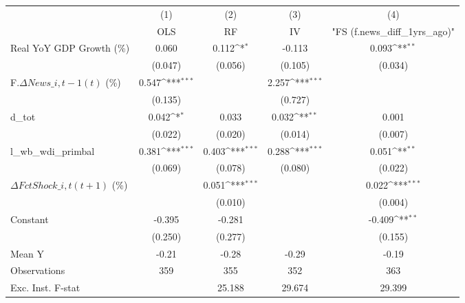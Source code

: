 {
\def\sym#1{\ifmmode^{#1}\else\(^{#1}\)\fi}
\begin{tabular}{l*{4}{c}}
\toprule
                    &\multicolumn{1}{c}{(1)}&\multicolumn{1}{c}{(2)}&\multicolumn{1}{c}{(3)}&\multicolumn{1}{c}{(4)}\\
                    &\multicolumn{1}{c}{OLS}&\multicolumn{1}{c}{RF}&\multicolumn{1}{c}{IV}&\multicolumn{1}{c}{ "FS (f.news\_diff\_1yrs\_ago)" }\\
\midrule
Real YoY GDP Growth (\%)&       0.060         &       0.112\sym{*}  &      -0.113         &       0.093\sym{**} \\
                    &     (0.047)         &     (0.056)         &     (0.105)         &     (0.034)         \\
\addlinespace
F.$ \Delta News\_{i,t-1}(t)$ (\%)&       0.547\sym{***}&                     &       2.257\sym{***}&                     \\
                    &     (0.135)         &                     &     (0.727)         &                     \\
\addlinespace
d\_tot               &       0.042\sym{*}  &       0.033         &       0.032\sym{**} &       0.001         \\
                    &     (0.022)         &     (0.020)         &     (0.014)         &     (0.007)         \\
\addlinespace
l\_wb\_wdi\_primbal    &       0.381\sym{***}&       0.403\sym{***}&       0.288\sym{***}&       0.051\sym{**} \\
                    &     (0.069)         &     (0.078)         &     (0.080)         &     (0.022)         \\
\addlinespace
$ \Delta FctShock\_{i,t}(t+1)$ (\%)&                     &       0.051\sym{***}&                     &       0.022\sym{***}\\
                    &                     &     (0.010)         &                     &     (0.004)         \\
\addlinespace
Constant            &      -0.395         &      -0.281         &                     &      -0.409\sym{**} \\
                    &     (0.250)         &     (0.277)         &                     &     (0.155)         \\
\midrule
Mean Y              &       -0.21         &       -0.28         &       -0.29         &       -0.19         \\
Observations        &         359         &         355         &         352         &         363         \\
Exc. Inst. F-stat   &                     &      25.188         &      29.674         &      29.399         \\
\bottomrule
\end{tabular}
}
